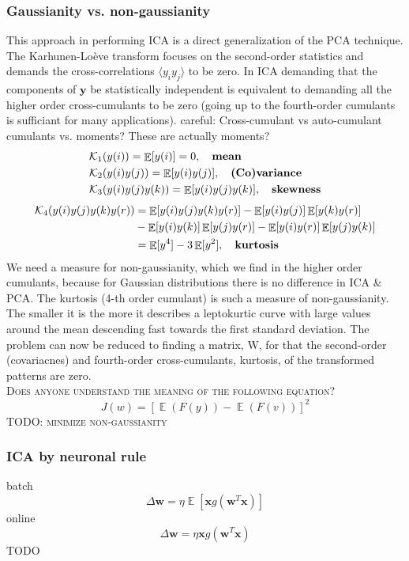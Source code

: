 \documentclass[11pt]{article}
\DeclareMathOperator{\E}{\mathbb{E}}
\begin{document}
\subsubsection{Gaussianity vs. non-gaussianity}
This approach in performing ICA is a direct generalization of the PCA technique. The Karhunen-Loève transform focuses on the second-order statistics and demands the cross-correlations $\langle y_iy_j \rangle$ to be zero. In ICA demanding that the components of $\mathbf{y}$ be statistically independent is equivalent to demanding all the higher order cross-cumulants to be zero (going up to the fourth-order cumulants is sufficiant for many applications).%
careful: Cross-cumulant vs auto-cumulant
cumulants vs. moments? These are actually moments?
\begin{align*}
&\mathcal{K}_1(y(i))=\E[y(i)]=0,\quad \text{\textbf{mean}}\\
&\mathcal{K}_2(y(i)y(j))=\E[y(i)y(j)],\quad \text{\textbf{(Co)variance}}\\
&\mathcal{K}_3(y(i)y(j)y(k))=\E[y(i)y(j)y(k)],\quad \text{\textbf{skewness}}
\end{align*}
\begin{align*}
\mathcal{K}_4(y(i)y(j)y(k)y(r))&=\E[y(i)y(j)y(k)y(r)]-\E[y(i)y(j)]\E[y(k)y(r)]\\
&-\E[y(i)y(k)]\E[y(j)y(r)]-\E[y(i)y(r)]\E[y(j)y(k)]\\
&=\E[y^4]-3\E[y^2],\quad \text{\textbf{kurtosis}}
\end{align*}
We need a measure for non-gaussianity, which we find in the higher order cumulants, because for Gaussian distributions there is no difference in ICA \& PCA. The kurtosis (4-th order cumulant) is such a measure of non-gaussianity. The smaller it is the more it describes a leptokurtic curve with large values around the mean descending fast towards the first standard deviation. The problem can now be reduced to finding a matrix, W, for that the second-order (covariacnes) and fourth-order cross-cumulants, kurtosis, of the transformed patterns are zero.\\
\textsc{Does anyone understand the meaning of the following equation?}
\[
J(w)=[\E(F(y))-\E(F(v))]^2
\]
\textsc{TODO: minimize non-gaussianity}

\subsubsection{ICA by neuronal rule}
batch
\[
\Delta \mathbf{w}=\eta\E\left[\mathbf{x}g(\mathbf{w}^T\mathbf{x})\right]
\]
online
\[
\Delta \mathbf{w}=\eta \mathbf{x} g(\mathbf{w}^T\mathbf{x})
\]
\textsc{TODO}
\end{document}
